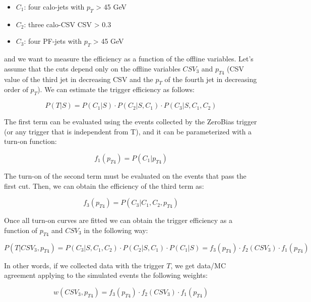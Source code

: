 \begin{itemize}
	\item $C_{1}$: four calo-jets with $p_{T}$ > 45 GeV
	\item $C_{2}$: three calo-CSV CSV > 0.3
	\item $C_{3}$: four PF-jets with $p_{T}$ > 45 GeV
\end{itemize}

and we want to measure the efficiency as a function of the offline variables. Let's assume that the cuts depend only on the offline variables $CSV_{3}$ and $p_{T4}$ (CSV value of the third jet in decreasing CSV and the $p_{T}$ of the fourth jet in decreasing order of $p_{T}$). We can estimate the trigger efficiency as follows:

\begin{equation}
P(T|S) = P(C_{1}|S)\cdot P(C_{2}|S,C_{1})\cdot P(C_{3}|S,C_{1},C_{2})
\end{equation}

The first term can be evaluated using the events collected by the ZeroBias trigger (or any trigger that is independent from T), and it can be parameterized with a turn-on function:

\begin{equation}
f_{1}(p_{T4}) = P(C_{1}|p_{T4})
\end{equation}

The turn-on of the second term must be evaluated on the events that pass the first cut. Then, we can obtain the efficiency of the third term as:

\begin{equation}
f_{3}(p_{T4}) = P(C_{3}|C_{1},C_{2},p_{T4})
\end{equation}

Once all turn-on curves are fitted we can obtain the trigger efficiency as a function of $p_{T4}$ and $CSV_{3}$ in the following way:

\begin{equation}
P(T|CSV_{3}, p_{T4}) = P(C_{3}|S,C_{1},C_{2})\cdot P(C_{2}|S,C_{1})\cdot P(C_{1}|S) = f_{3}(p_{T4}) \cdot f_{2}(CSV_{3}) \cdot f_{1}(p_{T4})
\end{equation}

In other words, if we collected data with the trigger $T$, we get data/MC agreement applying to the simulated events the following weights:

\begin{equation}
w(CSV_{3}, p_{T4}) = f_{3}(p_{T4}) \cdot f_{2}(CSV_{3}) \cdot f_{1}(p_{T4})
\end{equation}

